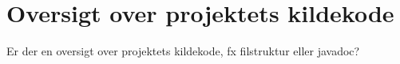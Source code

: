 

\section{Oversigt over projektets kildekode }
Er der en oversigt over projektets kildekode, fx filstruktur eller javadoc?